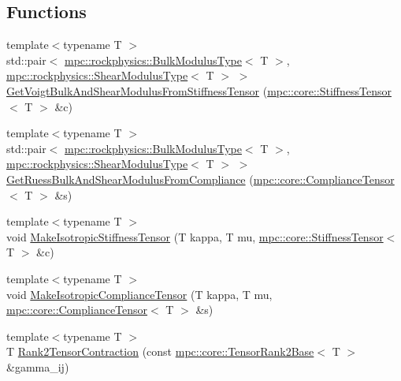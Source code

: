 \subsection*{Functions}
\begin{DoxyCompactItemize}
\item 
{\footnotesize template$<$typename T $>$ }\\std\+::pair$<$ \mbox{\hyperlink{structmpc_1_1rockphysics_1_1_bulk_modulus_type}{mpc\+::rockphysics\+::\+Bulk\+Modulus\+Type}}$<$ T $>$, \mbox{\hyperlink{structmpc_1_1rockphysics_1_1_shear_modulus_type}{mpc\+::rockphysics\+::\+Shear\+Modulus\+Type}}$<$ T $>$ $>$ \mbox{\hyperlink{namespacempc_1_1rockphysics_a902a5b076610546b106099671ae0a16a}{Get\+Voigt\+Bulk\+And\+Shear\+Modulus\+From\+Stiffness\+Tensor}} (\mbox{\hyperlink{structmpc_1_1core_1_1_stiffness_tensor}{mpc\+::core\+::\+Stiffness\+Tensor}}$<$ T $>$ \&c)
\item 
{\footnotesize template$<$typename T $>$ }\\std\+::pair$<$ \mbox{\hyperlink{structmpc_1_1rockphysics_1_1_bulk_modulus_type}{mpc\+::rockphysics\+::\+Bulk\+Modulus\+Type}}$<$ T $>$, \mbox{\hyperlink{structmpc_1_1rockphysics_1_1_shear_modulus_type}{mpc\+::rockphysics\+::\+Shear\+Modulus\+Type}}$<$ T $>$ $>$ \mbox{\hyperlink{namespacempc_1_1rockphysics_aaf1fb571ea01068c87bf84edab69dcaf}{Get\+Ruess\+Bulk\+And\+Shear\+Modulus\+From\+Compliance}} (\mbox{\hyperlink{structmpc_1_1core_1_1_compliance_tensor}{mpc\+::core\+::\+Compliance\+Tensor}}$<$ T $>$ \&s)
\item 
{\footnotesize template$<$typename T $>$ }\\void \mbox{\hyperlink{namespacempc_1_1rockphysics_acd5fe0ee3cac0cb810ca53c636186f59}{Make\+Isotropic\+Stiffness\+Tensor}} (T kappa, T mu, \mbox{\hyperlink{structmpc_1_1core_1_1_stiffness_tensor}{mpc\+::core\+::\+Stiffness\+Tensor}}$<$ T $>$ \&c)
\item 
{\footnotesize template$<$typename T $>$ }\\void \mbox{\hyperlink{namespacempc_1_1rockphysics_a75a4220a2ac8369dca978b0538d69f8b}{Make\+Isotropic\+Compliance\+Tensor}} (T kappa, T mu, \mbox{\hyperlink{structmpc_1_1core_1_1_compliance_tensor}{mpc\+::core\+::\+Compliance\+Tensor}}$<$ T $>$ \&s)
\item 
{\footnotesize template$<$typename T $>$ }\\T \mbox{\hyperlink{namespacempc_1_1rockphysics_a70f32dd89107171a423f129c9a33ee8d}{Rank2\+Tensor\+Contraction}} (const \mbox{\hyperlink{structmpc_1_1core_1_1_tensor_rank2_base}{mpc\+::core\+::\+Tensor\+Rank2\+Base}}$<$ T $>$ \&gamma\+\_\+ij)

\end{DoxyCompactItemize}
